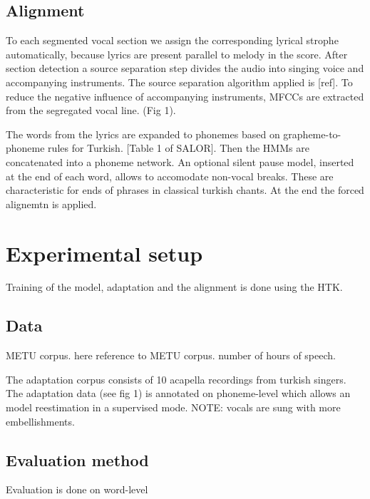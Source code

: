 \documentclass{article}
\begin{document}
\subsection{Alignment}
To each segmented vocal section we assign the corresponding lyrical strophe automatically, because lyrics are present parallel to melody in the score. After section detection a source separation step divides the audio into singing voice and accompanying instruments.  The source separation algorithm applied is [ref]. To reduce the negative influence of accompanying instruments, MFCCs are extracted from the segregated vocal line. (Fig 1). 

The words from the lyrics are expanded to phonemes based on grapheme-to-phoneme rules for Turkish. [Table 1 of SALOR].  
Then the HMMs are concatenated into a phoneme network. An optional silent pause model, inserted at the end of each word, allows to accomodate non-vocal breaks.  These are characteristic for ends of phrases in classical turkish chants. At the end the forced alignemtn is applied. 


\section{Experimental setup}
Training of the model, adaptation and the alignment is done using the HTK.

\subsection{Data}
METU corpus. here reference to METU corpus. number of hours of speech.  


The adaptation corpus consists of 10 acapella recordings from turkish singers.  
 The adaptation data (see fig 1) is annotated on phoneme-level which allows an model reestimation in a supervised mode.
NOTE: vocals are sung with more embellishments.

\subsection{Evaluation method}		
Evaluation is done on word-level



%

\end{document}
